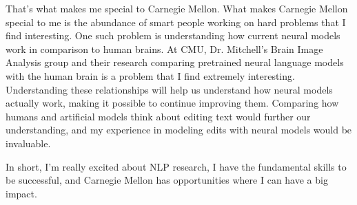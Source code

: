 \documentclass[11pt,letterpaper]{letter}
\begin{document}
That's what makes me special to Carnegie Mellon. 
What makes Carnegie Mellon special to me is the abundance of smart people working on hard problems that I find interesting. 
One such problem is understanding how current neural models work in comparison to human brains.
At CMU, Dr. Mitchell's Brain Image Analysis group and their research comparing pretrained neural language models with the human brain is a problem that I find extremely interesting.
Understanding these relationships will help us understand how neural models actually work, making it possible to continue improving them.
Comparing how humans and artificial models think about editing text would further our understanding, and my experience in modeling edits with neural models would be invaluable.

In short, I'm really excited about NLP research, I have the fundamental skills to be successful, and Carnegie Mellon has opportunities where I can have a big impact.
\end{document}
